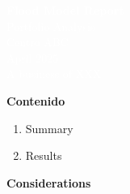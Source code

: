 \documentclass[
]{article}
\author{}
\date{\vspace{-2.5em}2025-04-15}
\begin{document}
\thispagestyle{empty}


\vspace*{6cm}

\begin{flushleft}
  {\fontsize{38}{45}\selectfont \textbf{\textcolor{white}{Flood Model Report}}} \\[0.8cm]
  {\fontsize{24}{30}\selectfont \textcolor{white}{Portfolio Analysis}} \\[1.2cm]
  {\fontsize{24}{30}\selectfont \textcolor{white}{Centro ABC}} \\[0.4cm]
  {\Large \textcolor{white}{April 2025}} \\[4cm]
  {\small \textcolor{white}{A business of XXX}}
\end{flushleft}

\noindent \textbf{\textcolor{turquesa}{\fontsize{16}{20}\selectfont Contenido}}

\noindent

\begin{enumerate}
  \item {\fontsize{11}{13}\selectfont Summary \dotfill \pageref{sec:summary}}
  \item {\fontsize{11}{13}\selectfont Results \dotfill \pageref{sec:results}}
\end{enumerate}

\newpage

\noindent \textbf{\textcolor{turquesa}{\fontsize{16}{20}\selectfont Considerations}}
\vspace{0.5cm}
\end{document}

